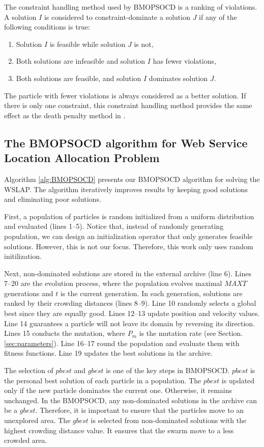 \documentclass[10pt,journal,compsoc]{IEEEtran}
\begin{document}
The constraint handling method used by BMOPSOCD is a ranking of violations. A solution $I$ is considered to constraint-dominate a solution $J$ if any of the following conditions is true:
\begin{enumerate}
 \item Solution $I$ is feasible while solution $J$ is not,
 \item Both solutions are infeasible and solution $I$ has fewer violations,
 \item Both solutions are feasible, and solution $I$ dominates solution $J$.
\end{enumerate}

The particle with fewer violations is always considered as a better solution. If there is only one constraint, this constraint handling method provides the same effect as the death penalty method in \cite{coello2002theoretical}.

\subsection{The BMOPSOCD algorithm for Web Service Location Allocation Problem}

Algorithm \ref{alg:BMOPSOCD} presents our BMOPSOCD algorithm for solving the WSLAP. The algorithm iteratively improves results by keeping good solutions and eliminating poor solutions.

First, a population of particles is random initialized from a uniform distribution and evaluated (lines 1--5). Notice that, instead of randomly generating population, we can design an initialization operator that only generates feasible solutions. However, this is not our focus. Therefore, this work only uses random initilization.

Next, non-dominated solutions are stored in the external archive (line 6). Lines 7--20 are the evolution process, where the population evolves maximal $MAXT$ generations and $t$ is the current generation. In each generation, solutions are ranked by their crowding distances (lines 8--9). Line 10 randomly selects a global best since they are equally good. Lines 12--13 update position and velocity values. Line 14 guarantees a particle will not leave its domain by reversing its direction. Lines 15 conducts the mutation, where $P_m$ is the mutation rate (see Section. \ref{sec:parameters}). Line 16--17 round the population and evaluate them with fitness functions. Line 19 updates the best solutions in the archive.

The selection of $pbest$ and $gbest$ is one of the key steps in BMOPSOCD. $pbest$ is the personal best solution of each particle in a population. The $pbest$ is updated only if the new particle dominates the current one. Otherwise, it remains unchanged. In the BMOPSOCD, any non-dominated solutions in the archive can be a $gbest$. Therefore, it is important to ensure that the particles move to an unexplored area. The $gbest$ is selected from non-dominated solutions with the highest crowding distance value. It ensures that the swarm move to a less crowded area.
\end{document}
